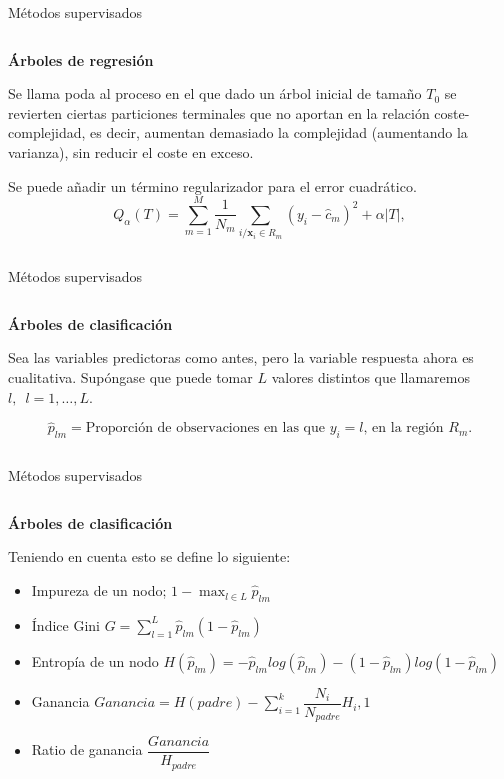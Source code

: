 \begin{frame}{Métodos supervisados}
\begin{columns}
\begin{column}{0.9\textwidth}
\textbf{Árboles de regresión}
\begin{defi}
Se llama poda al proceso en el que dado un árbol inicial de tamaño $T_0$ se revierten ciertas particiones terminales que no aportan en la relación coste-complejidad, es decir, aumentan demasiado la complejidad (aumentando la varianza), sin reducir el coste en exceso. 
\end{defi}

Se puede añadir un término regularizador para el error cuadrático.
\begin{equation}
Q_{\alpha}(T)=\sum_{m=1}^M\frac{1}{N_m}\sum_{i/\mathbf{x}_i\in R_m} (y_i-\hat{c}_m)^2+\alpha|T |,
\end{equation}
\end{column}
\end{columns}
\end{frame}


\begin{frame}{Métodos supervisados}
\begin{columns}
\begin{column}{0.9\textwidth}
\textbf{Árboles de clasificación}

Sea las variables predictoras como antes, pero la variable respuesta ahora es cualitativa. Supóngase que puede tomar $L$ valores distintos que llamaremos $l,\enspace l=1,\ldots, L$. 

\begin{equation}
\hat{p}_{lm}=\text{Proporción de observaciones en las que $y_i=l$, en la región $R_m$.}
\end{equation}
\end{column}
\end{columns}
\end{frame}

\begin{frame}{Métodos supervisados}
\begin{columns}
\begin{column}{0.9\textwidth}
\textbf{Árboles de clasificación}

Teniendo en cuenta esto se define lo siguiente:
\begin{itemize}
\item Impureza de un nodo; $1-\max_{l\in L} \hat{p}_{lm}$
\item Índice Gini $G=\sum_{l=1}^L\hat{p}_{lm}(1-\hat{p}_{lm})$
\item Entropía de un nodo $H(\hat{p}_{lm})=-\hat{p}_{lm}log(\hat{p}_{lm})-(1-\hat{p}_{lm})log(1-\hat{p}_{lm})$
\item Ganancia $Ganancia=H(padre)-\sum_{i=1}^k \dfrac{N_i}{N_{padre}}H_i,1$
\item Ratio de ganancia $\dfrac{Ganancia}{H_{padre}}$
\end{itemize}
\end{column}
\end{columns}
\end{frame}

